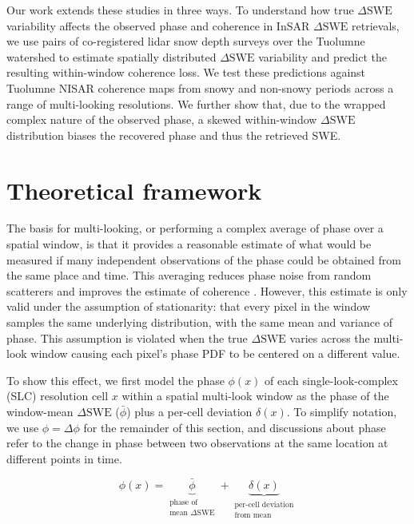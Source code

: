 \documentclass[tc, manuscript]{copernicus}
\begin{document}
Our work extends these studies in three ways. To understand how true $\Delta\mathrm{SWE}$ variability affects the observed phase and coherence in InSAR $\Delta\mathrm{SWE}$ retrievals, we use pairs of co-registered lidar snow depth surveys over the Tuolumne watershed to estimate spatially distributed $\Delta\mathrm{SWE}$ variability and predict the resulting within-window coherence loss. We test these predictions against Tuolumne NISAR coherence maps from snowy and non-snowy periods across a range of multi-looking resolutions. We further show that, due to the wrapped complex nature of the observed phase, a skewed within-window $\Delta\mathrm{SWE}$ distribution biases the recovered phase and thus the retrieved SWE.

\section{Theoretical framework}\label{sec:theoretical-framework}

The basis for multi-looking, or performing a complex average of phase over a spatial window, is that it provides a reasonable estimate of what would be measured if many independent observations of the phase could be obtained from the same place and time. This averaging reduces phase noise from random scatterers and improves the estimate of coherence \citep{Zebker1992, Bamler1998}. However, this estimate is only valid under the assumption of stationarity: that every pixel in the window samples the same underlying distribution, with the same mean and variance of phase. This assumption is violated when the true $\Delta\mathrm{SWE}$ varies across the multi-look window causing each pixel's phase PDF to be centered on a different value.

To show this effect, we first model the phase $\phi (x)$ of each single-look-complex (SLC) resolution cell $x$ within a spatial multi-look window as the phase of the window-mean $\Delta\mathrm{SWE}$ ($\bar{\phi}$) plus a per-cell deviation $\delta (x)$. To simplify notation, we use $\phi = \Delta\phi$ for the remainder of this section, and discussions about phase refer to the change in phase between two observations at the same location at different points in time.

\begin{equation}\label{eq:sigma_def}
      \phi (x) = \underbrace{\bar{\phi}}_{\substack{\text{phase of} \\ \text{mean $\Delta\mathrm{SWE}$}}}
           + \underbrace{\delta (x)}_{\substack{\text{per-cell deviation} \\ \text{from mean}}}
\end{equation}
\end{document}
